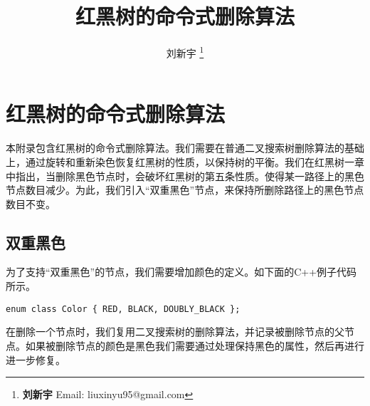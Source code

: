 \documentclass[UTF8]{article}
\begin{document}


\title{红黑树的命令式删除算法}

\author{刘新宇
\thanks{{\bfseries 刘新宇} \newline
  Email: liuxinyu95@gmail.com \newline}
  }

\maketitle
\fi


\ifx\wholebook\relax
\chapter{红黑树的命令式删除算法}
\fi


本附录包含红黑树的命令式删除算法。我们需要在普通二叉搜索树删除算法的基础上，通过旋转和重新染色恢复红黑树的性质，以保持树的平衡。我们在红黑树一章中指出，当删除黑色节点时，会破坏红黑树的第五条性质。使得某一路径上的黑色节点数目减少。为此，我们引入“双重黑色”节点，来保持所删除路径上的黑色节点数目不变。

\section{双重黑色}

为了支持“双重黑色”的节点，我们需要增加颜色的定义。如下面的C++例子代码所示。

\lstset{language=C++}
\begin{lstlisting}
enum class Color { RED, BLACK, DOUBLY_BLACK };
\end{lstlisting}

在删除一个节点时，我们复用二叉搜索树的删除算法，并记录被删除节点的父节点。如果被删除节点的颜色是黑色我们需要通过处理保持黑色的属性，然后再进行进一步修复。
\end{document}
